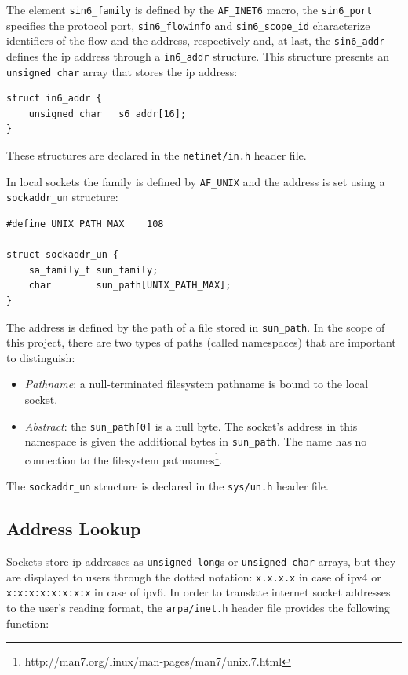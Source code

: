 The element \texttt{sin6\_family} is defined by the \texttt{AF\_INET6} macro, the \texttt{sin6\_port} specifies the protocol port, \texttt{sin6\_flowinfo} and \texttt{sin6\_scope\_id} characterize identifiers of the flow and the address, respectively and, at last, the \texttt{sin6\_addr} defines the \gls{ip} address through a \texttt{in6\_addr} structure. This structure presents an \texttt{unsigned char} array that stores the \gls{ip} address:

\begin{lstlisting}[caption=Declaration of the \texttt{in6\_addr} structure]
struct in6_addr {
    unsigned char   s6_addr[16];
}
\end{lstlisting}

These structures are declared in the \texttt{netinet/in.h} header file.

In local sockets the family is defined by \texttt{AF\_UNIX} and the address is set using a \texttt{sockaddr\_un} structure:

\begin{lstlisting}[caption=Declaration of the \texttt{sockaddr\_un} structure]
#define UNIX_PATH_MAX    108

struct sockaddr_un {
    sa_family_t	sun_family;
    char		sun_path[UNIX_PATH_MAX];
}
\end{lstlisting}

The address is defined by the path of a file stored in \texttt{sun\_path}. In the scope of this project, there are two types of paths (called namespaces) that are important to distinguish: 

\begin{itemize}
\item \textit{Pathname}: a null-terminated filesystem pathname is bound to the local socket.
\item \textit{Abstract}: the \texttt{sun\_path[0]} is a null byte. The socket's address in this namespace is given the additional bytes in \texttt{sun\_path}. The name has no connection to the filesystem pathnames\footnote{http://man7.org/linux/man-pages/man7/unix.7.html}.
\end{itemize} 

The \texttt{sockaddr\_un} structure is declared in the \texttt{sys/un.h} header file.

\subsection{Address Lookup}

Sockets store \gls{ip} addresses as \texttt{unsigned long}s or \texttt{unsigned char} arrays, but they are displayed to users through the dotted notation: \texttt{x.x.x.x} in case of \gls{ip}v4 or \texttt{x:x:x:x:x:x:x:x} in case of \gls{ip}v6. In order to translate internet socket addresses to the user's reading format, the \texttt{arpa/inet.h} header file provides the following function:

